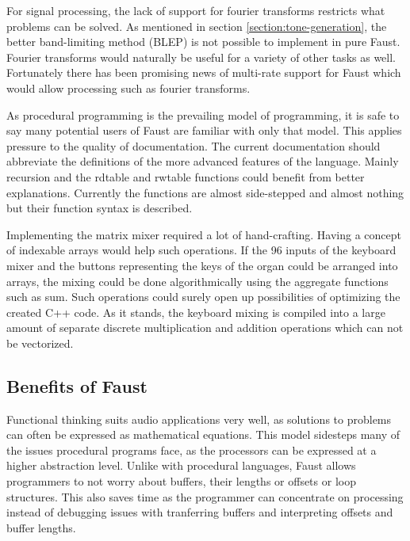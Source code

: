 \documentclass[11pt,a4paper]{article}
\begin{document}
For signal processing, the lack of support for fourier transforms restricts what problems can be solved. As mentioned in section \ref{section:tone-generation}, the better band-limiting method (BLEP) is not possible to implement in pure Faust. Fourier transforms would naturally be useful for a variety of other tasks as well. Fortunately there has been promising news of multi-rate support for Faust which would allow processing such as fourier transforms.

As procedural programming is the prevailing model of programming, it is safe to say many potential users of Faust are familiar with only that model. This applies pressure to the quality of documentation. The current documentation should abbreviate the definitions of the more advanced features of the language. Mainly recursion and the rdtable and rwtable functions could benefit from better explanations. Currently the functions are almost side-stepped and almost nothing but their function syntax is described.

Implementing the matrix mixer required a lot of hand-crafting. Having a concept of indexable arrays would help such operations. If the 96 inputs of the keyboard mixer and the buttons representing the keys of the organ could be arranged into arrays, the mixing could be done algorithmically using the aggregate functions such as sum. Such operations could surely open up possibilities of optimizing the created C++ code. As it stands, the keyboard mixing is compiled into a large amount of separate discrete multiplication and addition operations which can not be vectorized.



\subsection{Benefits of Faust}

Functional thinking suits audio applications very well, as solutions to problems can often be expressed as mathematical equations. This model sidesteps many of the issues procedural programs face, as the processors can be expressed at a higher abstraction level. Unlike with procedural languages, Faust allows programmers to not worry about buffers, their lengths or offsets or loop structures. This also saves time as the programmer can concentrate on processing instead of debugging issues with tranferring buffers and interpreting offsets and buffer lengths.
\end{document}
